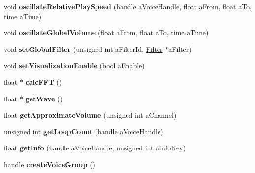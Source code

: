 \begin{DoxyCompactItemize}
\mbox{\label{class_so_loud_1_1_soloud_a9ad9542bc726a315b130b40916b095a0}} 
void {\bfseries oscillate\+Relative\+Play\+Speed} (handle a\+Voice\+Handle, float a\+From, float a\+To, time a\+Time)
\item 
\mbox{\label{class_so_loud_1_1_soloud_ae91d826c1d8ba64dbf395fe9c679a82e}} 
void {\bfseries oscillate\+Global\+Volume} (float a\+From, float a\+To, time a\+Time)
\item 
\mbox{\label{class_so_loud_1_1_soloud_a7a357dd58112d34becacfa100d6b7a19}} 
void {\bfseries set\+Global\+Filter} (unsigned int a\+Filter\+Id, \mbox{\hyperlink{class_so_loud_1_1_filter}{Filter}} $\ast$a\+Filter)
\item 
\mbox{\label{class_so_loud_1_1_soloud_a291ec9f5539cd530b6eec30ec83155b4}} 
void {\bfseries set\+Visualization\+Enable} (bool a\+Enable)
\item 
\mbox{\label{class_so_loud_1_1_soloud_a55452a807eb49c921492b10b6cb59316}} 
float $\ast$ {\bfseries calc\+F\+FT} ()
\item 
\mbox{\label{class_so_loud_1_1_soloud_a8851997da4b55d96f2131a838376e703}} 
float $\ast$ {\bfseries get\+Wave} ()
\item 
\mbox{\label{class_so_loud_1_1_soloud_a20327c5251ef10451a491f892eb56904}} 
float {\bfseries get\+Approximate\+Volume} (unsigned int a\+Channel)
\item 
\mbox{\label{class_so_loud_1_1_soloud_a52f6f46f7ae7336142b513ae9fb85d8a}} 
unsigned int {\bfseries get\+Loop\+Count} (handle a\+Voice\+Handle)
\item 
\mbox{\label{class_so_loud_1_1_soloud_a6d3e22a24f49a86edce0ad542d9656bb}} 
float {\bfseries get\+Info} (handle a\+Voice\+Handle, unsigned int a\+Info\+Key)
\item 
\mbox{\label{class_so_loud_1_1_soloud_aeb0fd120e6e0239c9e718fb8789ddffe}} 
handle {\bfseries create\+Voice\+Group} ()

\end{DoxyCompactItemize}
